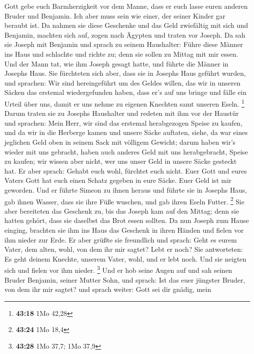 Gott gebe euch Barmherzigkeit vor dem Manne, dass er euch lasse euren
anderen Bruder und Benjamin. Ich aber muss sein wie einer, der seiner
Kinder gar beraubt ist.  Da nahmen sie diese Geschenke und
das Geld zwiefältig mit sich und Benjamin, machten sich auf, zogen nach
Ägypten und traten vor Joseph.  Da sah sie Joseph mit
Benjamin und sprach zu seinem Haushalter: Führe diese Männer ins Haus
und schlachte und richte zu; denn sie sollen zu Mittag mit mir essen.
 Und der Mann tat, wie ihm Joseph gesagt hatte, und führte
die Männer in Josephs Haus.  Sie fürchteten sich aber, dass
sie in Josephs Haus geführt wurden, und sprachen: Wir sind hereingeführt
um des Geldes willen, das wir in unseren Säcken das erstemal
wiedergefunden haben, dass er's auf uns bringe und fälle ein Urteil über
uns, damit er uns nehme zu eigenen Knechten samt unseren Eseln.
\footnote{\textbf{43:18} 1Mo 42,28}  Darum traten sie zu
Josephs Haushalter und redeten mit ihm vor der Haustür  und
sprachen: Mein Herr, wir sind das erstemal herabgezogen Speise zu
kaufen,  und da wir in die Herberge kamen und unsere Säcke
auftaten, siehe, da war eines jeglichen Geld oben in seinem Sack mit
völligem Gewicht; darum haben wir's wieder mit uns gebracht,
 haben auch anderes Geld mit uns herabgebracht, Speise zu
kaufen; wir wissen aber nicht, wer uns unser Geld in unsere Säcke
gesteckt hat.  Er aber sprach: Gehabt euch wohl, fürchtet
euch nicht. Euer Gott und eures Vaters Gott hat euch einen Schatz
gegeben in eure Säcke. Euer Geld ist mir geworden. Und er führte Simeon
zu ihnen heraus  und führte sie in Josephs Haus, gab ihnen
Wasser, dass sie ihre Füße wuschen, und gab ihren Eseln Futter.
\footnote{\textbf{43:24} 1Mo 18,4}  Sie aber bereiteten das
Geschenk zu, bis das Joseph kam auf den Mittag; denn sie hatten gehört,
dass sie daselbst das Brot essen sollten.  Da nun Joseph
zum Hause einging, brachten sie ihm ins Haus das Geschenk in ihren
Händen und fielen vor ihm nieder zur Erde.  Er aber grüßte
sie freundlich und sprach: Geht es eurem Vater, dem alten, wohl, von dem
ihr mir sagtet? Lebt er noch?  Sie antworteten: Es geht
deinem Knechte, unserem Vater, wohl, und er lebt noch. Und sie neigten
sich und fielen vor ihm nieder. \footnote{\textbf{43:28} 1Mo 37,7; 1Mo
  37,9}  Und er hob seine Augen auf und sah seinen Bruder
Benjamin, seiner Mutter Sohn, und sprach: Ist das euer jüngster Bruder,
von dem ihr mir sagtet? und sprach weiter: Gott sei dir gnädig, mein

